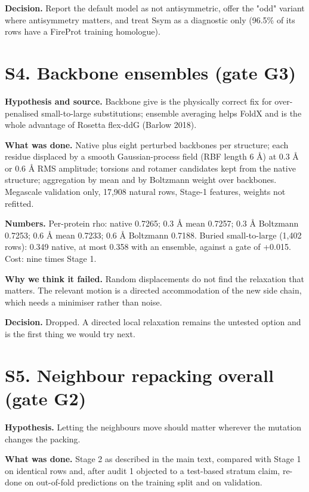 \documentclass[11pt,a4paper]{article}
\begin{document}
\textbf{Decision.} Report the default model as not antisymmetric, offer the "odd" variant where antisymmetry
matters, and treat Ssym as a diagnostic only (96.5\% of its rows have a FireProt training homologue).



\section{S4. Backbone ensembles (gate G3)}

\textbf{Hypothesis and source.} Backbone give is the physically correct fix for over-penalised small-to-large
substitutions; ensemble averaging helps FoldX and is the whole advantage of Rosetta flex-ddG (Barlow 2018).

\textbf{What was done.} Native plus eight perturbed backbones per structure; each residue displaced by a smooth
Gaussian-process field (RBF length 6 \AA{}) at 0.3 \AA{} or 0.6 \AA{} RMS amplitude; torsions and rotamer candidates kept
from the native structure; aggregation by mean and by Boltzmann weight over backbones. Megascale validation
only, 17,908 natural rows, Stage-1 features, weights not refitted.

\textbf{Numbers.} Per-protein rho: native 0.7265; 0.3 \AA{} mean 0.7257; 0.3 \AA{} Boltzmann 0.7253; 0.6 \AA{} mean 0.7233;
0.6 \AA{} Boltzmann 0.7188. Buried small-to-large (1,402 rows): 0.349 native, at most 0.358 with an ensemble,
against a gate of +0.015. Cost: nine times Stage 1.

\textbf{Why we think it failed.} Random displacements do not find the relaxation that matters. The relevant motion is
a directed accommodation of the new side chain, which needs a minimiser rather than noise.

\textbf{Decision.} Dropped. A directed local relaxation remains the untested option and is the first thing we would
try next.



\section{S5. Neighbour repacking overall (gate G2)}

\textbf{Hypothesis.} Letting the neighbours move should matter wherever the mutation changes the packing.

\textbf{What was done.} Stage 2 as described in the main text, compared with Stage 1 on identical rows and, after
audit 1 objected to a test-based stratum claim, re-done on out-of-fold predictions on the training split and on
validation.
\end{document}
